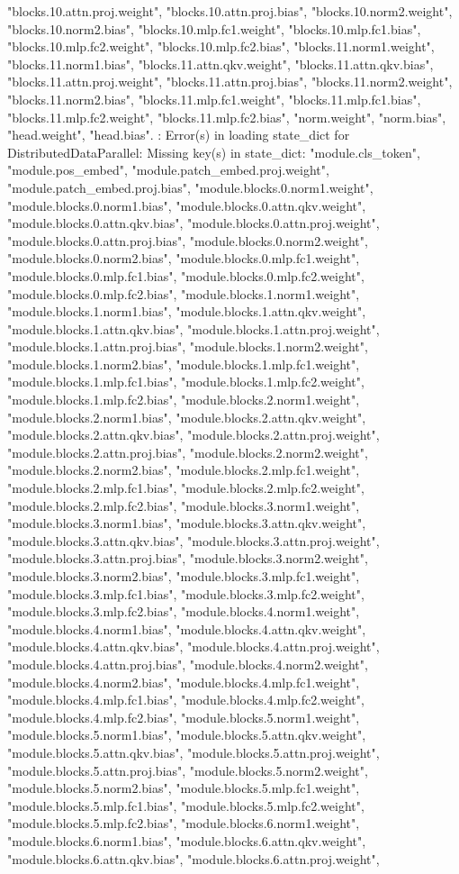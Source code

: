 "blocks.10.attn.proj.weight", "blocks.10.attn.proj.bias", "blocks.10.norm2.weight", "blocks.10.norm2.bias", "blocks.10.mlp.fc1.weight", "blocks.10.mlp.fc1.bias", "blocks.10.mlp.fc2.weight", "blocks.10.mlp.fc2.bias", "blocks.11.norm1.weight", "blocks.11.norm1.bias", "blocks.11.attn.qkv.weight", "blocks.11.attn.qkv.bias", "blocks.11.attn.proj.weight", "blocks.11.attn.proj.bias", "blocks.11.norm2.weight", "blocks.11.norm2.bias", "blocks.11.mlp.fc1.weight", "blocks.11.mlp.fc1.bias", "blocks.11.mlp.fc2.weight", "blocks.11.mlp.fc2.bias", "norm.weight", "norm.bias", "head.weight", "head.bias". : 
Error(s) in loading state_dict for DistributedDataParallel:
	Missing key(s) in state_dict: "module.cls_token", "module.pos_embed", "module.patch_embed.proj.weight", "module.patch_embed.proj.bias", "module.blocks.0.norm1.weight", "module.blocks.0.norm1.bias", "module.blocks.0.attn.qkv.weight", "module.blocks.0.attn.qkv.bias", "module.blocks.0.attn.proj.weight", "module.blocks.0.attn.proj.bias", "module.blocks.0.norm2.weight", "module.blocks.0.norm2.bias", "module.blocks.0.mlp.fc1.weight", "module.blocks.0.mlp.fc1.bias", "module.blocks.0.mlp.fc2.weight", "module.blocks.0.mlp.fc2.bias", "module.blocks.1.norm1.weight", "module.blocks.1.norm1.bias", "module.blocks.1.attn.qkv.weight", "module.blocks.1.attn.qkv.bias", "module.blocks.1.attn.proj.weight", "module.blocks.1.attn.proj.bias", "module.blocks.1.norm2.weight", "module.blocks.1.norm2.bias", "module.blocks.1.mlp.fc1.weight", "module.blocks.1.mlp.fc1.bias", "module.blocks.1.mlp.fc2.weight", "module.blocks.1.mlp.fc2.bias", "module.blocks.2.norm1.weight", "module.blocks.2.norm1.bias", "module.blocks.2.attn.qkv.weight", "module.blocks.2.attn.qkv.bias", "module.blocks.2.attn.proj.weight", "module.blocks.2.attn.proj.bias", "module.blocks.2.norm2.weight", "module.blocks.2.norm2.bias", "module.blocks.2.mlp.fc1.weight", "module.blocks.2.mlp.fc1.bias", "module.blocks.2.mlp.fc2.weight", "module.blocks.2.mlp.fc2.bias", "module.blocks.3.norm1.weight", "module.blocks.3.norm1.bias", "module.blocks.3.attn.qkv.weight", "module.blocks.3.attn.qkv.bias", "module.blocks.3.attn.proj.weight", "module.blocks.3.attn.proj.bias", "module.blocks.3.norm2.weight", "module.blocks.3.norm2.bias", "module.blocks.3.mlp.fc1.weight", "module.blocks.3.mlp.fc1.bias", "module.blocks.3.mlp.fc2.weight", "module.blocks.3.mlp.fc2.bias", "module.blocks.4.norm1.weight", "module.blocks.4.norm1.bias", "module.blocks.4.attn.qkv.weight", "module.blocks.4.attn.qkv.bias", "module.blocks.4.attn.proj.weight", "module.blocks.4.attn.proj.bias", "module.blocks.4.norm2.weight", "module.blocks.4.norm2.bias", "module.blocks.4.mlp.fc1.weight", "module.blocks.4.mlp.fc1.bias", "module.blocks.4.mlp.fc2.weight", "module.blocks.4.mlp.fc2.bias", "module.blocks.5.norm1.weight", "module.blocks.5.norm1.bias", "module.blocks.5.attn.qkv.weight", "module.blocks.5.attn.qkv.bias", "module.blocks.5.attn.proj.weight", "module.blocks.5.attn.proj.bias", "module.blocks.5.norm2.weight", "module.blocks.5.norm2.bias", "module.blocks.5.mlp.fc1.weight", "module.blocks.5.mlp.fc1.bias", "module.blocks.5.mlp.fc2.weight", "module.blocks.5.mlp.fc2.bias", "module.blocks.6.norm1.weight", "module.blocks.6.norm1.bias", "module.blocks.6.attn.qkv.weight", "module.blocks.6.attn.qkv.bias", "module.blocks.6.attn.proj.weight", 